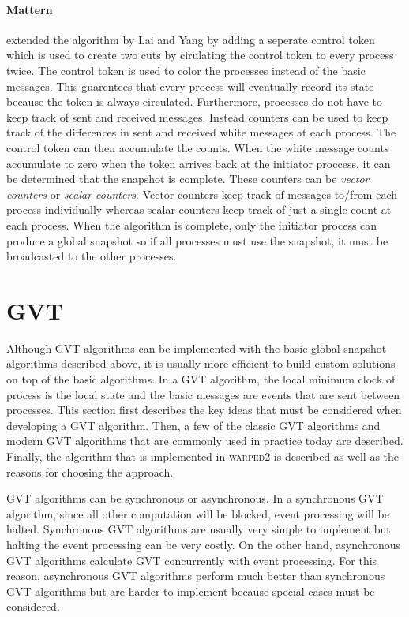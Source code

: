 \documentclass[11pt]{book}
\begin{document}
\paragraph{Mattern}\cite{mattern-93} extended the algorithm by Lai and Yang by adding a
seperate control token which is used to create two cuts by cirulating the control token to
every process twice. The control token is used to color the processes instead of the basic
messages. This guarentees that every process will eventually record its state because the
token is always circulated. Furthermore, processes do not have to keep track of sent and
received messages. Instead counters can be used to keep track of the differences in sent
and received white messages at each process. The control token can then accumulate the
counts. When the white message counts accumulate to zero when the token arrives back at
the initiator proccess, it can be determined that the snapshot is complete. These counters
can be \emph{vector counters} or \emph{scalar counters}. Vector counters keep track of
messages to/from each process individually whereas scalar counters keep track of just a
single count at each process. When the algorithm is complete, only the initiator process
can produce a global snapshot so if all processes must use the snapshot, it must be broadcasted
to the other processes.

\section{GVT}

Although GVT algorithms can be implemented with the basic global snapshot algorithms described
above, it is usually more efficient to build custom solutions on top of the basic algorithms.
In a GVT algorithm, the local minimum clock of process is the local state and the basic
messages are events that are sent between processes. This section first describes the key
ideas that must be considered when developing a GVT algorithm. Then, a few of the classic
GVT algorithms and modern GVT algorithms that are commonly used in practice today are described.
Finally, the algorithm that is implemented in \textsc{warped2} is described as well as the
reasons for choosing the approach.

GVT algorithms can be synchronous or asynchronous. In a synchronous GVT algorithm, since
all other computation will be blocked, event processing will be halted. Synchronous GVT
algorithms are usually very simple to implement but halting the event processing can
be very costly. On the other hand, asynchronous GVT algorithms calculate GVT concurrently
with event processing. For this reason, asynchronous GVT algorithms perform much better
than synchronous GVT algorithms but are harder to implement because special cases must be
considered.
\end{document}
